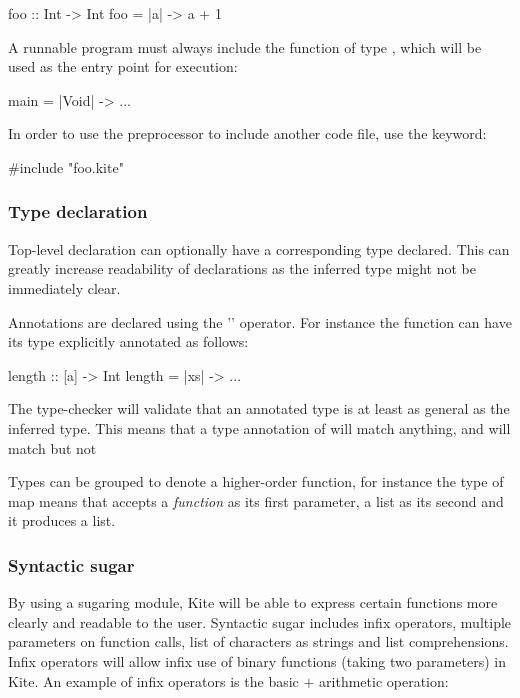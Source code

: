 \begin{kite}
foo :: Int -> Int
foo = |a| -> {
  a + 1
}
\end{kite}

A runnable program must always include the  function of type , which will be used as the entry point for execution:

\begin{kite}
main = |Void| -> { ... }
\end{kite}

In order to use the preprocessor to include another code file, use the  keyword:
\begin{kite}
#include "foo.kite"
\end{kite}

\subsubsection{Type declaration}

Top-level declaration can optionally have a corresponding type declared. This can greatly increase readability of declarations as the inferred type might not be immediately clear.

Annotations are declared using the '\code{::}' operator. For instance the function  can have its type explicitly annotated as follows:

\begin{kite}
length :: [a] -> Int
length = |xs| -> {
  ...
}
\end{kite}

The type-checker will validate that an annotated type is at least as general as the inferred type. This means that a type annotation of  will match anything, and  will match  but not 

Types can be grouped to denote a higher-order function, for instance the type of map  means that  accepts a \emph{function} as its first parameter, a list as its second and it produces a list.

\subsubsection{Syntactic sugar}
\label{sec:kite-design-sugar}
By using a sugaring module, Kite will be able to express certain functions more clearly and readable to the user. Syntactic sugar includes infix operators, multiple parameters on function calls, list of characters as strings and list comprehensions. Infix operators will allow infix use of binary functions (taking two parameters) in Kite. An example of infix operators is the basic $+$ arithmetic operation:

